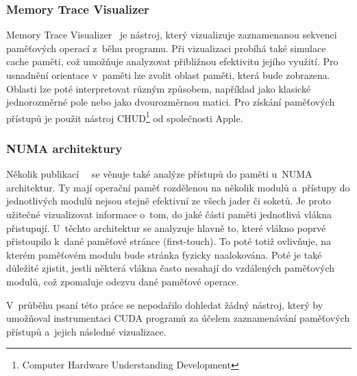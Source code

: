 \subsubsection*{Memory Trace Visualizer}
Memory Trace Visualizer~\cite{mtv} je nástroj, který vizualizuje zaznamenanou sekvenci paměťových operací z~běhu programu. Při vizualizaci probíhá také simulace cache paměti, což umožňuje analyzovat přibližnou efektivitu jejího využití. Pro usnadnění orientace v~paměti lze zvolit oblast paměti, která bude zobrazena. Oblasti lze poté interpretovat různým způsobem, například jako klasické jednorozměrné pole nebo jako dvourozměrnou matici. Pro získání paměťových přístupů je použit nástroj CHUD\footnote{Computer Hardware Understanding Development} od společnosti Apple.

\subsubsection*{NUMA architektury}
Několik publikací~\cite{numa-visualisation}~\cite{numa-tabarnac} se věnuje také analýze přístupů do paměti u~NUMA architektur. Ty mají operační paměť rozdělenou na několik modulů a~přístupy do jednotlivých modulů nejsou stejně efektivní ze všech jader či soketů. Je proto užitečné vizualizovat informace o~tom, do jaké části paměti jednotlivá vlákna přistupují. U~těchto architektur se analyzuje hlavně to, které vlákno poprvé přistoupilo k~dané paměťové stránce (first-touch). To poté totiž ovlivňuje, na kterém paměťovém modulu bude stránka fyzicky naalokována. Poté je také důležité zjistit, jestli některá vlákna často nesahají do vzdálených paměťových modulů, což zpomaluje odezvu dané paměťové operace.

V~průběhu psaní této práce se nepodařilo dohledat žádný nástroj, který by umožňoval instrumentaci CUDA programů za účelem zaznamenávání paměťových přístupů a~jejich následné vizualizace.
